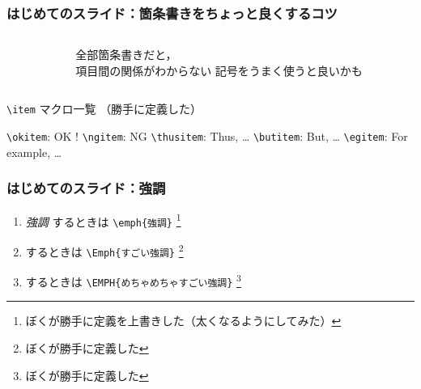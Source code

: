 \begin{frame}[fragile]
  \frametitle{はじめてのスライド：箇条書きを{\normalsize ちょっと}良くするコツ}
  \begin{columns}
    \begin{column}{0.54\textwidth}
      
    \end{column}
    \begin{column}{0.46\textwidth}
      \begin{itemize}
        \ngitem
        全部箇条書きだと，\\
        項目間の関係がわからない
        \thusitem 記号をうまく使うと良いかも
      \end{itemize}
    \end{column}
  \end{columns}

  \begin{mybox}{\texttt{\textbackslash item} マクロ一覧%
        {\footnotesize （勝手に定義した）}
    }
    \begin{itemize}
      \okitem \verb|\okitem|: OK !
      \ngitem \verb|\ngitem|: NG
      \thusitem \verb|\thusitem|: Thus, \dots
      \butitem \verb|\butitem|: But, \dots
      \egitem \verb|\egitem|: For example, \dots
    \end{itemize}
  \end{mybox}
\end{frame}

\begin{frame}[fragile]
  \frametitle{はじめてのスライド：強調}
  \begin{enumerate}
  \item
    \emph{強調} するときは \verb|\emph{強調}|%
    \footnote{\insertfootnotemark
    ぼくが勝手に定義を上書きした（太くなるようにしてみた）
    }
  \item
     するときは \verb|\Emph{すごい強調}|%
    \footnote{\insertfootnotemark
    ぼくが勝手に定義した
    }
  \item {} するときは \verb|\EMPH{めちゃめちゃすごい強調}|%
    \footnote{\insertfootnotemark
    ぼくが勝手に定義した
    }
  \end{enumerate}
  
\end{frame}


